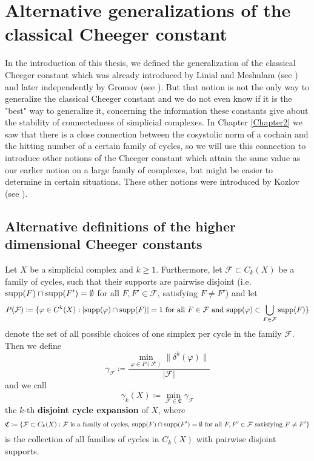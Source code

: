 
\chapter{Alternative generalizations of the classical Cheeger constant}

\label{Chapter6}

In the introduction of this thesis, we defined the generalization of the classical Cheeger constant which was already introduced by Linial and Meshulam (see \cite{2}) and later independently by Gromov (see \cite{3}). But that notion is not the only way to generalize the classical Cheeger constant and we do not even know if it is the "best" way to generalize it, concerning the information these constants give about the stability of connectedness of simplicial complexes. In Chapter \ref{Chapter2} we saw that there is a close connection between the cosystolic norm of a cochain and the hitting number of a certain family of cycles, so we will use this connection to introduce other notions of the Cheeger constant which attain the same value as our earlier notion on a large family of complexes, but might be easier to determine in certain situations. These other notions were introduced by Kozlov (see \cite{13}).

\section{Alternative definitions of the higher dimensional Cheeger constants}

\begin{defi}\label{definition411}
Let \(X\) be a simplicial complex and \(k\geq 1\). Furthermore, let \(\mathcal{F}\subset C_k(X)\) be a family of cycles, such that their supports are pairwise disjoint (i.e. \(\mathrm{supp}(F)\cap\mathrm{supp}(F')=\emptyset\) for all \(F,F'\in\mathcal{F}\), satisfying \(F\neq F'\)) and let
\[
P(\mathcal{F})\coloneqq\{\varphi\in C^k(X):|\mathrm{supp}(\varphi)\cap\mathrm{supp}(F)|=1\text{ for all }F\in\mathcal{F}\text{ and }\mathrm{supp}(\varphi)\subset\bigcup\limits_{F\in\mathcal{F}}\mathrm{supp}(F)\}
\]
denote the set of all possible choices of one simplex per cycle in the family \(\mathcal{F}\). Then we define
\[
\gamma_{\mathcal{F}}\coloneqq\frac{\min\limits_{\varphi\in P(\mathcal{F})}\|\delta^k(\varphi)\|}{|\mathcal{F}|}
\]
and we call
\[
\gamma_k(X)\coloneqq\min\limits_{\mathcal{F}\in\mathfrak{C}}\gamma_{\mathcal{F}}
\]
the \(k\)-th \textbf{disjoint cycle expansion} of \(X\), where 
\[
\mathfrak{C}\coloneqq\{\mathcal{F}\subset C_k(X):\mathcal{F}\text{ is a family of cycles, }\mathrm{supp}(F)\cap\mathrm{supp}(F')=\emptyset\text{ for all }F,F'\in\mathcal{F}\text{ satisfying }F\neq F'\}
\]
is the collection of all families of cycles in \(C_k(X)\) with pairwise disjoint supports.
\end{defi}

